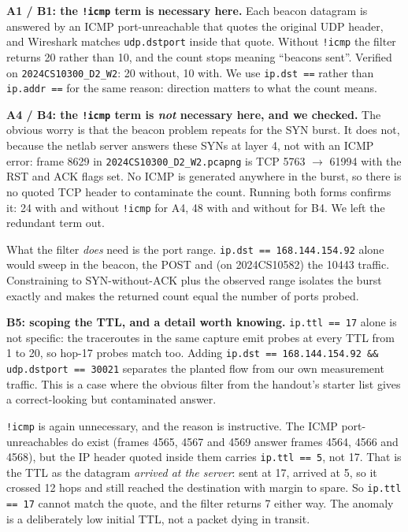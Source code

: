 \textbf{A1 / B1: the \texttt{!icmp} term is necessary here.} Each beacon datagram is answered
by an ICMP port-unreachable that quotes the original UDP header, and Wireshark matches
\texttt{udp.dstport} inside that quote. Without \texttt{!icmp} the filter returns 20 rather than
10, and the count stops meaning ``beacons sent''. Verified on
\texttt{2024CS10300\_D2\_W2}: 20 without, 10 with. We use \texttt{ip.dst ==} rather than
\texttt{ip.addr ==} for the same reason: direction matters to what the count means.

\textbf{A4 / B4: the \texttt{!icmp} term is \emph{not} necessary here, and we checked.} The
obvious worry is that the beacon problem repeats for the SYN burst. It does not, because the
netlab server answers these SYNs at layer 4, not with an ICMP error: frame 8629 in
\texttt{2024CS10300\_D2\_W2.pcapng} is TCP 5763 $\rightarrow$ 61994 with the RST and ACK flags
set. No ICMP is generated anywhere in the burst, so there is no quoted TCP header to contaminate
the count. Running both forms confirms it: 24 with and without \texttt{!icmp} for A4, 48 with and
without for B4. We left the redundant term out.

What the filter \emph{does} need is the port range. \texttt{ip.dst == 168.144.154.92} alone would
sweep in the beacon, the POST and (on 2024CS10582) the 10443 traffic. Constraining to
SYN-without-ACK plus the observed range isolates the burst exactly and makes the returned count
equal the number of ports probed.

\textbf{B5: scoping the TTL, and a detail worth knowing.} \texttt{ip.ttl == 17} alone is not
specific: the traceroutes in the same capture emit probes at every TTL from 1 to 20, so hop-17
probes match too. Adding \texttt{ip.dst == 168.144.154.92 \&\& udp.dstport == 30021} separates
the planted flow from our own measurement traffic. This is a case where the obvious filter from
the handout's starter list gives a correct-looking but contaminated answer.

\texttt{!icmp} is again unnecessary, and the reason is instructive. The ICMP port-unreachables do
exist (frames 4565, 4567 and 4569 answer frames 4564, 4566 and 4568), but the IP header
quoted inside them carries \texttt{ip.ttl == 5}, not 17. That is the TTL as the datagram
\emph{arrived at the server}: sent at 17, arrived at 5, so it crossed 12 hops and still reached
the destination with margin to spare. So \texttt{ip.ttl == 17} cannot match the quote, and the
filter returns 7 either way. The anomaly is a deliberately low initial TTL, not a packet dying in
transit.

